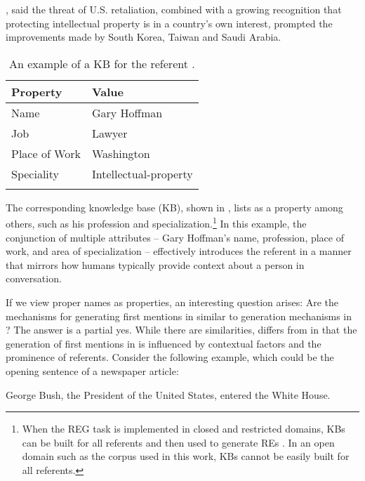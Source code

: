 \begin{exe}
	\ex\label{ex:gary} , said the threat of U.S. retaliation, combined with a growing recognition that protecting intellectual property is in a country's own interest, prompted the improvements made by South Korea, Taiwan and Saudi Arabia.
\end{exe}

\begin{table}
	\begin{tabular}{ll}
		\lsptoprule
		Property & Value \\
		\midrule
		Name & Gary Hoffman \\
		Job & Lawyer \\
		Place of Work & Washington \\
		Speciality & Intellectual-property \\
		\lspbottomrule
	\end{tabular}\caption{An example of a KB for the referent .}\label{tab:kb}
\end{table}

The corresponding knowledge base (KB), shown in , lists  as a property among others, such as his profession and specialization.\footnote{When the REG task is implemented in closed and restricted domains, KBs can be built for all referents and then used to generate REs \citep{siddharthan-copestake-2004-generating}. In an open domain such as the \wsj corpus used in this work, KBs cannot be easily built for all referents.} In this example, the conjunction of multiple attributes -- Gary Hoffman's name, profession, place of work, and area of specialization -- effectively introduces the referent in a manner that mirrors how humans typically provide context about a person in conversation.




If we view proper names as properties, an interesting question arises: Are the mechanisms for generating first mentions in \context similar to generation mechanisms in \shot? The answer is a partial yes. While there are similarities, \context differs from \shot in that the generation of first mentions in \context is influenced by contextual factors and the prominence of referents. Consider the following example, which could be the opening sentence of a newspaper article:

\begin{exe}
	\ex\label{ex:bush} George Bush, the President of the United States, entered the White House.
\end{exe}


